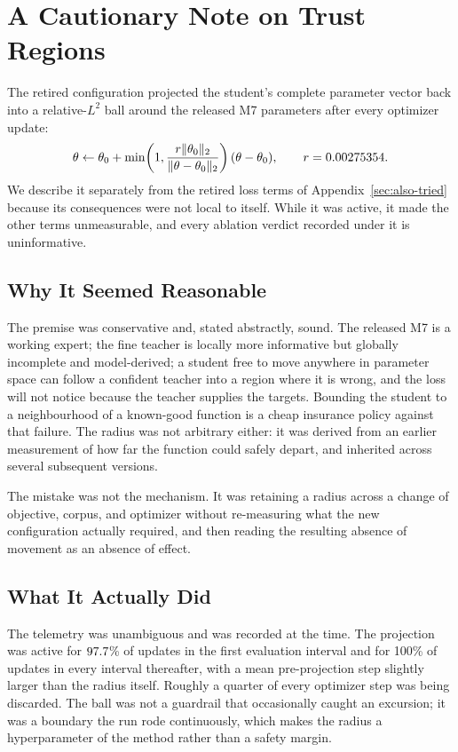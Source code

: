 \section{A Cautionary Note on Trust Regions}
\label{sec:trust}

The retired configuration projected the student's complete parameter vector
back into a relative-$L^2$ ball around the released M7 parameters after every
optimizer update:
\begin{equation}
\theta \leftarrow \theta_0 +
\min\!\left(1,\frac{r\lVert\theta_0\rVert_2}
{\lVert\theta-\theta_0\rVert_2}\right)(\theta-\theta_0),
\qquad r=0.00275354.
\label{eq:trust}
\end{equation}
We describe it separately from the retired loss terms of
Appendix~\ref{sec:also-tried} because its consequences were not local to itself.
While it was active, it made the other terms unmeasurable, and every ablation
verdict recorded under it is uninformative.

\subsection{Why It Seemed Reasonable}

The premise was conservative and, stated abstractly, sound.
The released M7 is a working expert; the fine teacher is locally more
informative but globally incomplete and model-derived; a student free to move
anywhere in parameter space can follow a confident teacher into a region where
it is wrong, and the loss will not notice because the teacher supplies the
targets.
Bounding the student to a neighbourhood of a known-good function is a cheap
insurance policy against that failure.
The radius was not arbitrary either: it was derived from an earlier measurement
of how far the function could safely depart, and inherited across several
subsequent versions.

The mistake was not the mechanism.
It was retaining a radius across a change of objective, corpus, and optimizer
without re-measuring what the new configuration actually required, and then
reading the resulting absence of movement as an absence of effect.

\subsection{What It Actually Did}

The telemetry was unambiguous and was recorded at the time.
The projection was active for $97.7$\% of updates in the first
evaluation interval and for 100\% of updates in every interval thereafter, with
a mean pre-projection step slightly larger than the radius itself.
Roughly a quarter of every optimizer step was being discarded.
The ball was not a guardrail that occasionally caught an excursion; it was a
boundary the run rode continuously, which makes the radius a hyperparameter of
the method rather than a safety margin.

